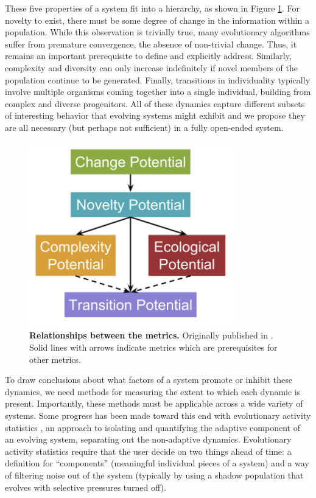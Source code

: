 \documentclass[letterpaper]{article}
\begin{document}
These five properties of a system fit into a hierarchy, as shown in Figure \ref{hierarchy}. For novelty to exist, there must be some degree of change in the information within a population. While this observation is trivially true, many evolutionary algorithms suffer from premature convergence, the absence of non-trivial change. Thus, it remains an important prerequisite to define and explicitly address. Similarly, complexity and diversity can only increase indefinitely if novel members of the population continue to be generated. Finally, transitions in individuality typically involve multiple organisms coming together into a single individual, building from complex and diverse progenitors.  All of these dynamics capture different subsets of interesting behavior that evolving systems might exhibit and we propose they are all necessary (but perhaps not sufficient) in a fully open-ended system.

\begin{figure}
\includegraphics[width=3.5in]{figs/Complexity_Barriers.png}
\caption{\textbf{Relationships between the metrics.} Originally published in \citep{blogpost}. Solid lines with arrows indicate metrics which are prerequisites for other metrics.}
\label{hierarchy}
\end{figure}

To draw conclusions about what factors of a system promote or inhibit these dynamics, we need methods for measuring the extent to which each dynamic is present. Importantly, these methods must be applicable across a wide variety of systems. Some progress has been made toward this end with evolutionary activity statistics \citep{bedau_classification_1998, channon_passing_2001}, an approach to isolating and quantifying the adaptive component of an evolving system, separating out the non-adaptive dynamics. Evolutionary activity statistics require that the user decide on two things ahead of time: a definition for ``components'' (meaningful individual pieces of a system) and a way of filtering noise out of the system (typically by using a shadow population that evolves with selective pressures turned off). 
\end{document}
